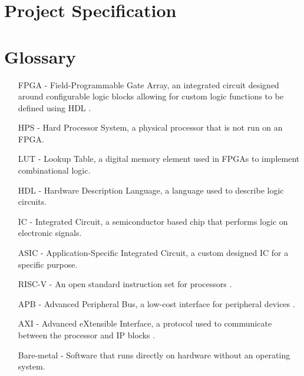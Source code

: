 \documentclass[a4paper,fleqn,twoside,12pt]{article}
\begin{document}


\pagestyle{plain}





\newpage
\appendix

\section{Project Specification}


\section{Glossary}
\begin{enumerate}
	\item [ FPGA - ] Field-Programmable Gate Array, an integrated circuit designed around configurable logic blocks allowing for custom logic functions to be defined using HDL \cite{whatisanfpga}.
	\item [ HPS - ] Hard Processor System, a physical processor that is not run on an FPGA.
	\item [ LUT - ] Lookup Table, a digital memory element used in FPGAs to implement combinational logic.
	\item [ HDL - ] Hardware Description Language, a language used to describe logic circuits.
	\item [ IC - ] Integrated Circuit, a semiconductor based chip that performs logic on electronic signals.
	\item [ ASIC - ] Application-Specific Integrated Circuit, a custom designed IC for a specific purpose.
	\item [ RISC-V - ] An open standard instruction set for processors \cite{risc}.
	\item [ APB - ] Advanced Peripheral Bus, a low-cost interface for peripheral devices \cite{APB}.
	\item [ AXI - ]  Advanced eXtensible Interface, a protocol used to communicate between the processor and IP blocks \cite{axi}.
	\item [ Bare-metal - ] Software that runs directly on hardware without an operating system.
\end{enumerate}



\end{document}
